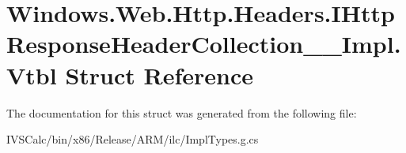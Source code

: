 \hypertarget{struct_windows_1_1_web_1_1_http_1_1_headers_1_1_i_http_response_header_collection_____impl_1_1_vtbl}{}\section{Windows.\+Web.\+Http.\+Headers.\+I\+Http\+Response\+Header\+Collection\+\_\+\+\_\+\+Impl.\+Vtbl Struct Reference}
\label{struct_windows_1_1_web_1_1_http_1_1_headers_1_1_i_http_response_header_collection_____impl_1_1_vtbl}


The documentation for this struct was generated from the following file\+:\begin{DoxyCompactItemize}
\item 
I\+V\+S\+Calc/bin/x86/\+Release/\+A\+R\+M/ilc/Impl\+Types.\+g.\+cs\end{DoxyCompactItemize}

